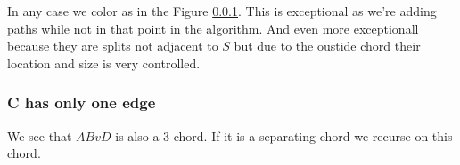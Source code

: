 In any case we color as in the Figure \ref{}. This is exceptional as we're adding paths while not in that point in the algorithm. And even more exceptionall because they are splits not adjacent to $S$ but due to the oustide chord their location and size is very controlled. 

\subsubsection{C has only one edge}
We see that $ABvD$ is also a 3-chord. If it is a separating chord we recurse on this chord.
